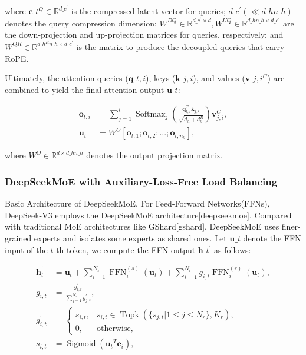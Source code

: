 \documentclass[11pt,a4paper]{article}
\begin{document}
where $\mathbf{c}\_{t}^{Q} \in \mathbb{R}^{d\_c^{\prime}}$ is the compressed latent vector for queries; 
$d\_c^{\prime} (\ll d\_h n\_h)$ denotes the query compression dimension; 
$W^{DQ} \in \mathbb{R}^{d\_c^{\prime} \times d}, W^{UQ} \in \mathbb{R}^{d\_h n\_h \times d\_c^{\prime}}$ are the down-projection and up-projection matrices for queries, respectively;
and $W^{QR} \in \mathbb{R}^{d\_h^R n\_h \times d\_c^{\prime}}$ is the matrix to produce the decoupled queries that carry RoPE.

Ultimately, the attention queries ($\mathbf{q}\_{t, i}$), keys ($\mathbf{k}\_{j, i}$), and values ($\mathbf{v}\_{j, i}^{C}$) are combined to yield the final attention output $\mathbf{u}\_{t}$:

$$\begin{align}
    \mathbf{o}_{t, i} &= \sum_{j=1}^{t} \operatorname{Softmax}_j(\frac{\mathbf{q}_{t, i}^T \mathbf{k}_{j, i}}{\sqrt{d_{h} + d_{h}^{R}}}) \mathbf{v}_{j, i}^{C}, \\
    \mathbf{u}_{t} &= W^{O} [\mathbf{o}_{t, 1};\mathbf{o}_{t, 2};...;\mathbf{o}_{t, n_{h}}],
\end{align}$$

where $W^{O} \in \mathbb{R}^{d \times d\_h n\_h}$ denotes the output projection matrix.

\subsubsection{DeepSeekMoE with Auxiliary-Loss-Free Load Balancing}

Basic Architecture of DeepSeekMoE.
For Feed-Forward Networks(FFNs), DeepSeek-V3 employs the DeepSeekMoE architecture[deepseekmoe]. 
Compared with traditional MoE architectures like GShard[gshard], DeepSeekMoE uses finer-grained experts and isolates some experts as shared ones.
Let $\mathbf{u}\_{t}$ denote the FFN input of the $t$-th token, we compute the FFN output $\mathbf{h}\_{t}^{\prime}$ as follows:

$$\begin{align}
    \mathbf{h}_{t}^{\prime} & = \mathbf{u}_{t} + \sum_{i=1}^{N_{s}} {\operatorname{FFN}^{(s)}_{i}\left( \mathbf{u}_{t} \right)} + \sum_{i=1}^{N_r} {g_{i,t} \operatorname{FFN}^{(r)}_{i}\left( \mathbf{u}_{t} \right)}, \\
    g_{i,t} & = \frac{g^{\prime}_{i,t}}{\sum_{j=1}^{N_r} g^{\prime}_{j,t}}, \\
    g^{\prime}_{i,t} & = \begin{cases} 
    s_{i,t}, & s_{i,t} \in \operatorname{Topk} (\{ s_{j, t} | 1 \leq j \leq N_r \}, K_{r}), \\
    0, & \text{otherwise}, 
    \end{cases} \\
    s_{i,t} & = \operatorname{Sigmoid} \left( {\mathbf{u}_{t}}^{T} \mathbf{e}_{i} \right),
\end{align}$$
\end{document}
